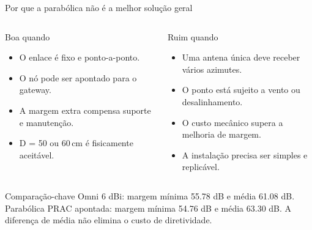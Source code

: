 \documentclass[aspectratio=169]{beamer}
\newcommand{\SI}[2]{#1\,#2}
\begin{document}
\begin{frame}{Por que a parabólica não é a melhor solução geral}
\small
\begin{columns}[T,onlytextwidth]
\begin{block}{Boa quando}
\begin{itemize}
  \item O enlace é fixo e ponto-a-ponto.
  \item O nó pode ser apontado para o gateway.
  \item A margem extra compensa suporte e manutenção.
  \item D = 50 ou \SI{60}{cm} é fisicamente aceitável.
\end{itemize}
\end{block}
\begin{block}{Ruim quando}
\begin{itemize}
  \item Uma antena única deve receber vários azimutes.
  \item O ponto está sujeito a vento ou desalinhamento.
  \item O custo mecânico supera a melhoria de margem.
  \item A instalação precisa ser simples e replicável.
\end{itemize}
\end{block}
\end{columns}
\begin{block}{Comparação-chave}
Omni 6 dBi: margem mínima 55.78 dB e média 61.08 dB. Parabólica PRAC apontada: margem mínima 54.76 dB e média 63.30 dB. A diferença de média não elimina o custo de diretividade.
\end{block}
\end{frame}
\end{document}
